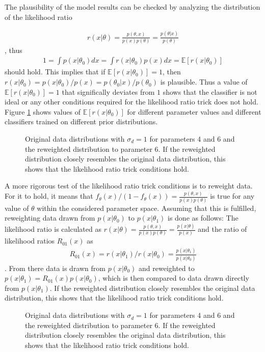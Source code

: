 \documentclass{article}
\begin{document}
The plausibility of the model results can be checked by analyzing the distribution of the likelihood ratio

\begin{align*}
r(x|\theta) = \frac{p(\theta,x)}{p(x)p(\theta)}=\frac{p(\theta|x)}{p(\theta)}
\end{align*},
thus
\begin{align*}
1=\int p(x|\theta_0) dx = \int r(x|\theta_0) p(x) dx = \mathbb{E} [r(x|\theta_0)]
\end{align*}
should hold. This implies that if $\mathbb{E} [r(x|\theta_0)]=1$, then $r(x|\theta_0) = p(x|\theta_0) / p(x) = p(\theta_0 | x) / p(\theta_0)$ is plausible. Thus a value of $\mathbb{E} [r(x|\theta_0)]=1$ that significally deviates from $1$ shows that the classifier is not ideal or any other conditions required for the likelihood ratio trick does not hold. Figure \ref{fig:ratio_violins} shows values of $\mathbb{E}[r(x|\theta_0)]$ for different parameter values and different classifiers trained on different prior distributions.

\begin{figure}[ht]
    \centering
    
    \caption{Original data distributions with $\sigma_d=1$ for parameters 4 and 6 and the reweighted distribution to parameter 6. If the reweighted distribution closely resembles the original data distribution, this shows that the likelihood ratio trick conditions hold.}
    \label{fig:ratio_violins}
\end{figure}

A more rigorous test of the likelihood ratio trick conditions is to reweight data.
For it to hold, it means that $f_\theta(x)/(1-f_\theta(x)) = \frac{p(\theta,x)}{p(x)p(\theta)}$ is true for any value of $\theta$ within the considered parameter space.
Assuming that this is fulfilled, reweighting data drawn from $p(x|\theta_0)$ to $p(x|\theta_1)$ is done as follows:
The likelihood ratio is calculated as $r(x|\theta) = \frac{p(\theta,x)}{p(x)p(\theta)} = \frac{p(x|\theta)}{p(x)}$ and the ratio of likelihood ratios $R_{01}(x)$ as
\begin{align*}
    R_{01}(x) = r(x|\theta_1)/r(x|\theta_0) = \frac{p(x|\theta_1)}{p(x|\theta_0)}
\end{align*}.
From there data is drawn from $p(x|\theta_0)$ and reweighted to $p(x|\theta_1) = R_{01}(x) p(x|\theta_0)$, which is then compared to data drawn directly from $p(x|\theta_1)$.
If the reweighted distribution closely resembles the original data distribution, this shows that the likelihood ratio trick conditions hold.


\begin{figure}[ht]
    \centering
    
    \caption{Original data distributions with $\sigma_d=1$ for parameters 4 and 6 and the reweighted distribution to parameter 6. If the reweighted distribution closely resembles the original data distribution, this shows that the likelihood ratio trick conditions hold.}
    \label{fig:reweighted_distributions_4_6}
\end{figure}
\end{document}
